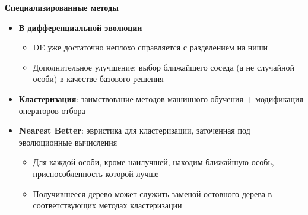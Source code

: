 \textbf{Специализированные методы}
\begin{itemize}
    \item \textbf{В дифференциальной эволюции}
    \begin{itemize}
        \item DE уже достаточно неплохо справляется с разделением на ниши
        \item Дополнительное улучшение: выбор ближайшего соседа (а не случайной особи) в качестве базового решения
    \end{itemize}
    \item \textbf{Кластеризация}: заимствование методов машинного обучения + модификация операторов отбора
    \item \textbf{Nearest Better}: эвристика для кластеризации, заточенная под эволюционные вычисления
    \begin{itemize}
        \item Для каждой особи, кроме наилучшей, находим ближайшую особь, приспособленность которой лучше
        \item Получившееся дерево может служить заменой остовного дерева в соответствующих методах кластеризации
    \end{itemize}
\end{itemize}